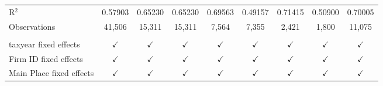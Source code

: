 \begin{tabular}{lcccccccc}
    \\
   R$^2$                                   & 0.57903       & 0.65230       & 0.65230       & 0.69563       & 0.49157        & 0.71415       & 0.50900       & 0.70005\\  
   Observations                            & 41,506        & 15,311        & 15,311        & 7,564         & 7,355          & 2,421         & 1,800         & 11,075\\  
    \\
   taxyear fixed effects                   & $\checkmark$  & $\checkmark$  & $\checkmark$  & $\checkmark$  & $\checkmark$   & $\checkmark$  & $\checkmark$  & $\checkmark$\\   
   Firm ID fixed effects                   & $\checkmark$  & $\checkmark$  & $\checkmark$  & $\checkmark$  & $\checkmark$   & $\checkmark$  & $\checkmark$  & $\checkmark$\\   
   Main Place fixed effects                & $\checkmark$  & $\checkmark$  & $\checkmark$  & $\checkmark$  & $\checkmark$   & $\checkmark$  & $\checkmark$  & $\checkmark$\\   
   \bottomrule
\end{tabular}
\par\endgroup
